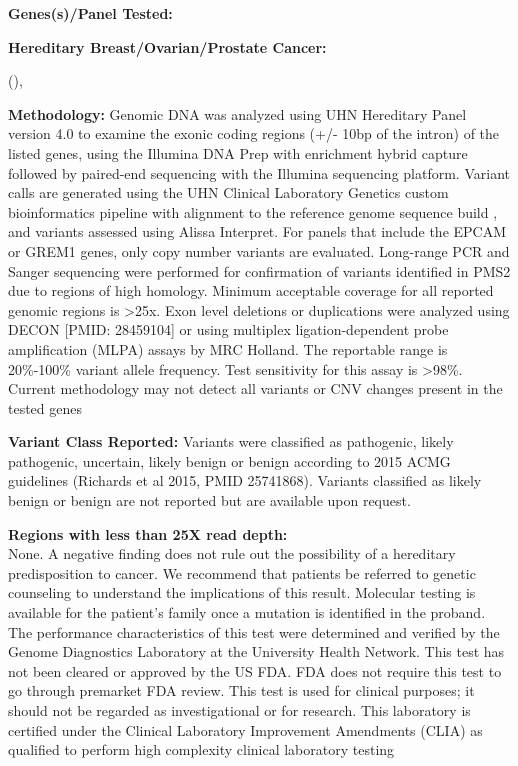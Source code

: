 \documentclass[9pt]{extarticle}
\newcommand{\data}[1]{}
\newenvironment{dataiter}[1]{}{}
\begin{document}
\begin{flushleft}
{\bf Genes(s)/Panel Tested:}

{\bf Hereditary Breast/Ovarian/Prostate Cancer:}

\begin{dataiter}{tested_genes}
  \data{gene_symbol} (\data{refseq_mrna}),\end{dataiter}

{\bf Methodology: } Genomic DNA was analyzed using UHN Hereditary Panel version 4.0 to examine the exonic coding regions (+/- 10bp of the intron) of the listed genes, using the Illumina DNA Prep with enrichment hybrid capture followed by paired-end sequencing with the Illumina sequencing platform. Variant calls are generated using the UHN Clinical Laboratory Genetics custom bioinformatics pipeline with alignment to the reference genome sequence build \data{reference_genome}, and variants assessed using Alissa Interpret. For panels that include the EPCAM or GREM1 genes, only copy number variants are evaluated. Long-range PCR and Sanger sequencing were performed for confirmation of variants identified in PMS2 due to regions of high homology. Minimum acceptable coverage for all reported genomic regions is >25x. Exon level deletions or duplications were analyzed using DECON [PMID: 28459104] or using multiplex ligation-dependent probe amplification (MLPA) assays by MRC Holland. The reportable range is 20\%-100\% variant allele frequency. Test sensitivity for this assay is >98\%. Current methodology may not detect all variants or CNV changes present in the tested genes

{\bf Variant Class Reported: } Variants were classified as pathogenic, likely pathogenic, uncertain, likely benign or benign according to 2015 ACMG guidelines (Richards et al 2015, PMID 25741868). Variants classified as likely benign or benign are not reported but are available upon request. 

{\bf Regions with less than 25X read depth: \\}
None. 
\newline
\newline
A negative finding does not rule out the possibility of a hereditary predisposition to cancer. We recommend that patients be referred to genetic counseling to understand the implications of this result. Molecular testing is available for the patient's family once a mutation is identified in the proband. 
\newline
\newline
The performance characteristics of this test were determined and verified by the Genome Diagnostics Laboratory at the University Health Network. This test has not been cleared or approved by the US FDA. FDA does not require this test to go through premarket FDA review. This test is used for clinical purposes; it should not be regarded as investigational or for research. This laboratory is certified under the Clinical Laboratory Improvement Amendments (CLIA) as qualified to perform high complexity clinical laboratory testing
\end{flushleft}
\end{document}
